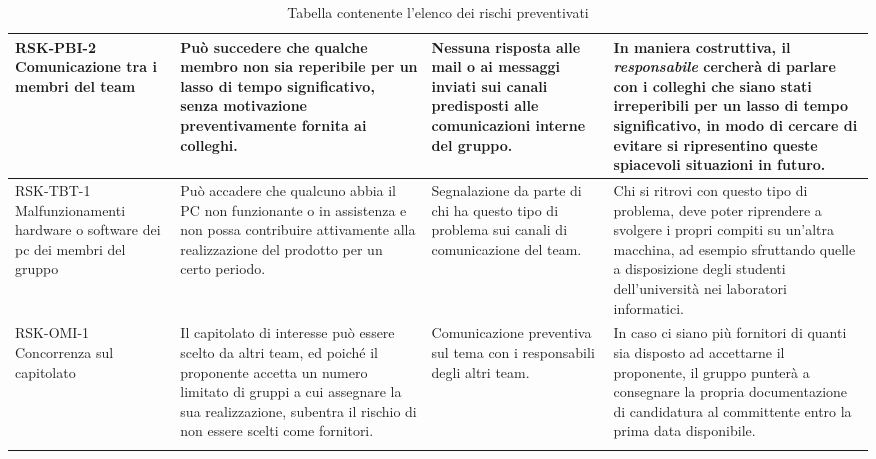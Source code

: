 \begin{center}
\begin{longtable}{|p{3cm}|p{4cm}|p{3.5cm}|p{3.5cm}|}
		RSK-PBI-2 \newline Comunicazione tra i membri del team
		& 
		Può succedere che qualche membro non sia reperibile per un lasso di tempo significativo, senza motivazione preventivamente fornita ai colleghi.
		&   
		Nessuna risposta alle mail o ai messaggi inviati sui canali predisposti alle comunicazioni interne del gruppo.
		& 
		In maniera costruttiva, il \textit{responsabile}
		   cercherà di parlare con i colleghi che siano stati irreperibili per un lasso di tempo significativo, in modo di cercare di evitare si ripresentino queste spiacevoli situazioni in futuro. \\
		\hline
		
		RSK-TBT-1 \newline Malfunzionamenti hardware o software dei pc dei membri del gruppo
		& 
		Può accadere che qualcuno abbia il PC non funzionante o in assistenza e non possa contribuire attivamente alla realizzazione del prodotto per un certo periodo.
		&   
		Segnalazione da parte di chi ha questo tipo di problema sui canali di comunicazione del team.
		& 
		Chi si ritrovi con questo tipo di problema, deve poter riprendere a svolgere i propri compiti su un'altra macchina, ad esempio sfruttando quelle a disposizione degli studenti dell'università nei laboratori informatici. \\
		\hline

		RSK-OMI-1 \newline Concorrenza sul capitolato
		& 
		Il capitolato di interesse può essere scelto da altri team, ed poiché il proponente accetta un numero limitato di gruppi a cui assegnare la sua realizzazione, subentra il rischio di non essere scelti come fornitori.
		&   
		Comunicazione preventiva sul tema con i responsabili degli altri team.
		& 
		In caso ci siano più fornitori di quanti sia disposto ad accettarne il proponente, il gruppo punterà a consegnare la propria documentazione di candidatura al committente entro la prima data disponibile. \\
		\hline
	
		\caption{Tabella contenente l'elenco dei rischi preventivati}
	\end{longtable}

\end{center}
